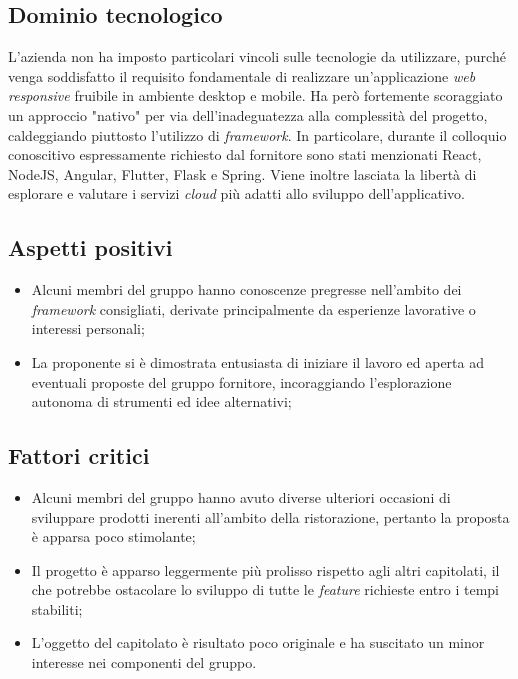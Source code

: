 \documentclass[8pt]{article}
\begin{document}
\subsection{Dominio tecnologico}
L'azienda non ha imposto particolari vincoli sulle tecnologie da utilizzare, purché venga soddisfatto il requisito fondamentale di realizzare un'applicazione \textit{web responsive} fruibile in ambiente desktop e mobile. Ha però fortemente scoraggiato un approccio "nativo" per via dell'inadeguatezza alla complessità del progetto, caldeggiando piuttosto l'utilizzo di \textit{framework}. In particolare, durante il colloquio conoscitivo espressamente richiesto dal fornitore sono stati menzionati React, NodeJS, Angular, Flutter, Flask e Spring. Viene inoltre lasciata la libertà di esplorare e valutare i servizi \textit{cloud} più adatti allo sviluppo dell'applicativo. 

\subsection{Aspetti positivi}
\begin{itemize}
	\setlength\itemsep{0em}
	\item Alcuni membri del gruppo hanno conoscenze pregresse nell'ambito dei \textit{framework} consigliati, derivate principalmente da esperienze lavorative o interessi personali;
	\item La proponente si è dimostrata entusiasta di iniziare il lavoro ed aperta ad eventuali proposte del gruppo fornitore, incoraggiando l'esplorazione autonoma di strumenti ed idee alternativi;
\end{itemize}

\subsection{Fattori critici}
\begin{itemize}
	\setlength\itemsep{0em}
	\item Alcuni membri del gruppo hanno avuto diverse ulteriori occasioni di sviluppare prodotti inerenti all'ambito della ristorazione, pertanto la proposta è apparsa poco stimolante;    
	\item Il progetto è apparso leggermente più prolisso rispetto agli altri capitolati, il che potrebbe ostacolare lo sviluppo di tutte le \textit{feature} richieste entro i tempi stabiliti;
	\item L'oggetto del capitolato è risultato poco originale e ha suscitato un minor interesse nei componenti del gruppo.
\end{itemize}
\end{document}
